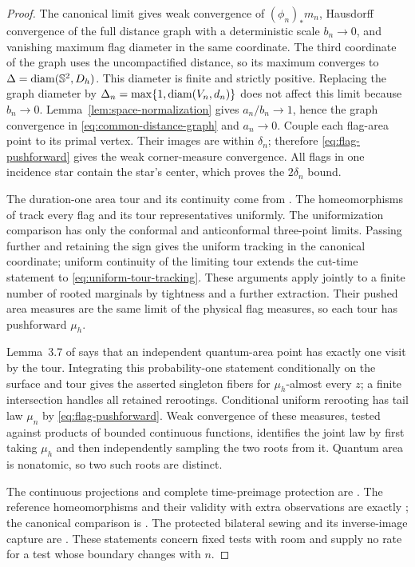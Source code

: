 \begin{proof}
The canonical limit \cite[Theorem~1.1]{C} gives weak convergence of
\((\phi_n)_*m_n\), Hausdorff convergence of the full distance graph with a
deterministic scale \(b_n\to0\), and vanishing maximum flag diameter in the
same coordinate.  The third coordinate of the graph uses the uncompactified
distance, so its maximum converges to
\(\Delta=\operatorname{diam}(\mathbb S^2,D_h)\).  This diameter is finite and strictly positive.
Replacing the graph diameter by \(\Delta_n=\max\{1,\operatorname{diam}(V_n,d_n)\}\)
does not affect this limit because \(b_n\to0\).  Lemma~\ref{lem:space-normalization}
gives \(a_n/b_n\to1\), hence the graph convergence in
\eqref{eq:common-distance-graph} and \(a_n\to0\).  Couple each flag-area
point to its primal vertex.  Their images are within \(\delta_n\); therefore
\eqref{eq:flag-pushforward} gives the weak corner-measure convergence.
All flags in one incidence star contain the star's center, which proves the
\(2\delta_n\) bound.

The duration-one area tour and its continuity come from
\cite[Theorem~3.4]{C}.  The homeomorphisms of
\cite[Theorem~4.8]{C} track every flag and its tour representatives uniformly.
The uniformization comparison \cite[Theorem~8.8]{C} has only the conformal
and anticonformal three-point limits.  Passing further and retaining the
sign gives the uniform tracking in the canonical coordinate; uniform
continuity of the limiting tour extends the cut-time statement to
\eqref{eq:uniform-tour-tracking}.  These arguments apply jointly to a
finite number of rooted marginals by tightness and a further extraction.
Their pushed area measures are the same limit of the physical flag measures,
so each tour has pushforward \(\mu_h\).

Lemma~3.7 of \cite{C} says that an independent quantum-area point has exactly
one visit by the tour.  Integrating this probability-one statement
conditionally on the surface and tour gives the asserted singleton fibers
for \(\mu_h\)-almost every \(z\); a finite intersection handles all retained
rerootings.  Conditional uniform rerooting has tail law \(\mu_n\) by
\eqref{eq:flag-pushforward}.  Weak convergence of these measures, tested
against products of bounded continuous functions, identifies the joint law
by first taking \(\mu_h\) and then independently sampling the two roots
from it.  Quantum area is
nonatomic, so two such roots are distinct.

The continuous projections and complete time-preimage protection are
\cite[Proposition~4.2 and Lemma~4.3]{C}.  The reference homeomorphisms
and their validity with extra observations are exactly
\cite[Theorem~4.8]{C}; the canonical comparison is
\cite[Theorem~8.8]{C}.  The protected bilateral sewing and its inverse-image
capture are \cite[Proposition~4.9]{C}.  These statements concern fixed tests
with room and supply no rate for a test whose boundary changes with \(n\).


\end{proof}
